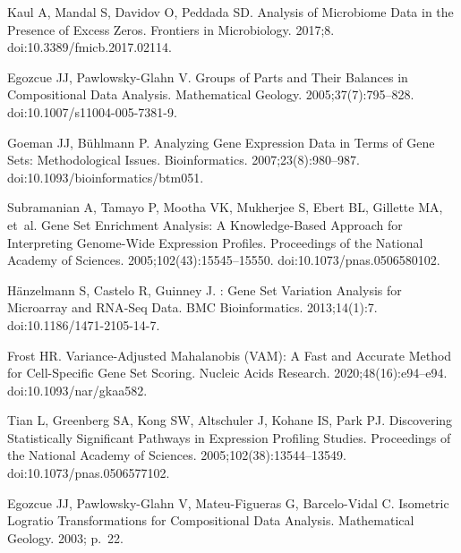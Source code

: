 \documentclass[10pt,letterpaper]{article}
\begin{document}
\begin{thebibliography}{10}
    Kaul A, Mandal S, Davidov O, Peddada SD.
    \newblock Analysis of {{Microbiome Data}} in the {{Presence}} of {{Excess
      Zeros}}.
    \newblock Frontiers in Microbiology. 2017;8.
    \newblock doi:{10.3389/fmicb.2017.02114}.
    
    Egozcue JJ, {Pawlowsky-Glahn} V.
    \newblock Groups of {{Parts}} and {{Their Balances}} in {{Compositional Data
      Analysis}}.
    \newblock Mathematical Geology. 2005;37(7):795--828.
    \newblock doi:{10.1007/s11004-005-7381-9}.
    
    Goeman JJ, B{\"u}hlmann P.
    \newblock Analyzing Gene Expression Data in Terms of Gene Sets: Methodological
      Issues.
    \newblock Bioinformatics. 2007;23(8):980--987.
    \newblock doi:{10.1093/bioinformatics/btm051}.
    
    Subramanian A, Tamayo P, Mootha VK, Mukherjee S, Ebert BL, Gillette MA, et~al.
    \newblock Gene Set Enrichment Analysis: {{A}} Knowledge-Based Approach for
      Interpreting Genome-Wide Expression Profiles.
    \newblock Proceedings of the National Academy of Sciences.
      2005;102(43):15545--15550.
    \newblock doi:{10.1073/pnas.0506580102}.
    
    H{\"a}nzelmann S, Castelo R, Guinney J.
    : Gene Set Variation Analysis for Microarray and
      {{RNA}}-{{Seq}} Data.
    \newblock BMC Bioinformatics. 2013;14(1):7.
    \newblock doi:{10.1186/1471-2105-14-7}.
    
    Frost HR.
    \newblock Variance-Adjusted {{Mahalanobis}} ({{VAM}}): A Fast and Accurate
      Method for Cell-Specific Gene Set Scoring.
    \newblock Nucleic Acids Research. 2020;48(16):e94--e94.
    \newblock doi:{10.1093/nar/gkaa582}.
    
    Tian L, Greenberg SA, Kong SW, Altschuler J, Kohane IS, Park PJ.
    \newblock Discovering Statistically Significant Pathways in Expression
      Profiling Studies.
    \newblock Proceedings of the National Academy of Sciences.
      2005;102(38):13544--13549.
    \newblock doi:{10.1073/pnas.0506577102}.
    
    Egozcue JJ, {Pawlowsky-Glahn} V, {Mateu-Figueras} G, {Barcelo-Vidal} C.
    \newblock Isometric {{Logratio Transformations}} for {{Compositional Data
      Analysis}}.
    \newblock Mathematical Geology. 2003; p.~22.
    

\end{thebibliography}
\end{document}
